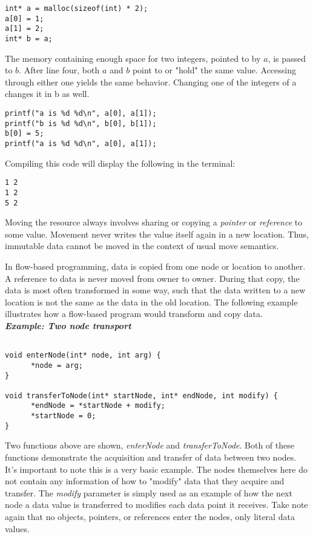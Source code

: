 \begin{lstlisting}[style=numc]
int* a = malloc(sizeof(int) * 2);
a[0] = 1;
a[1] = 2;
int* b = a;
\end{lstlisting}

\par The memory containing enough space for two integers, pointed to by $a$, is passed to $b$. After line four, both $a$ and $b$ point to or "hold" the same value. Accessing through either one yields the same behavior. Changing one of the integers of a changes it in b as well.

\begin{lstlisting}[style=customc]
printf("a is %d %d\n", a[0], a[1]);
printf("b is %d %d\n", b[0], b[1]);
b[0] = 5;
printf("a is %d %d\n", a[0], a[1]);
\end{lstlisting}

\par Compiling this code will display the following in the terminal:

\begin{lstlisting}[style=customc]
1 2
1 2
5 2
\end{lstlisting}

\par Moving the resource always involves sharing or copying a \emph{pointer} or \emph{reference} to some value. Movement never writes the value itself again in a new location. Thus, immutable data cannot be moved in the context of usual move semantics. 
\par In flow-based programming, data is copied from one node or location to another. A reference to data is never moved from owner to owner. During that copy, the data is most often transformed in some way, such that the data written to a new location is not the same as the data in the old location. The following example illustrates how a flow-based program would transform and copy data. \\

\textbf{\emph{Example: Two node transport}}

\begin{lstlisting}[style=numc]

void enterNode(int* node, int arg) {
      *node = arg;
}

void transferToNode(int* startNode, int* endNode, int modify) {
      *endNode = *startNode + modify;
      *startNode = 0;
}

\end{lstlisting}

\par Two functions above are shown, \emph{enterNode} and \emph{transferToNode}. Both of these functions demonstrate the acquisition  and transfer of data between two nodes. It's important to note this is a very basic example. The nodes themselves here do not contain any information of how to "modify" data that they acquire and transfer. The \emph{modify} parameter is simply used as an example of how the next node a data value is transferred to modifies each data point it receives. Take note again that no objects, pointers, or references enter the nodes, only literal data values.


